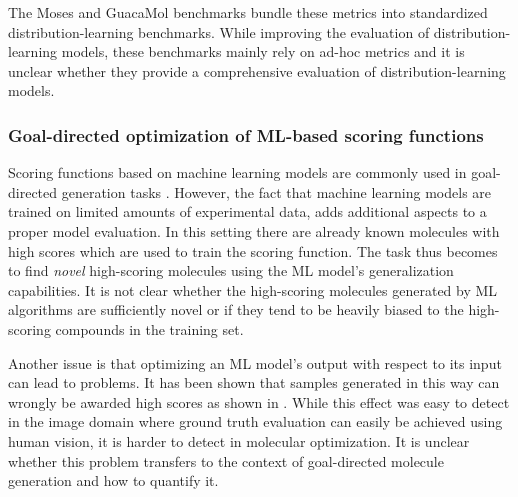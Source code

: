The Moses \citep{polykovskiyMolecularSetsMOSES2020} and GuacaMol
\citep{brownGuacaMolBenchmarkingModels2019} benchmarks bundle these metrics into standardized
distribution-learning benchmarks. While improving the evaluation of distribution-learning
models, these benchmarks mainly rely on ad-hoc metrics and it is unclear
whether they provide a comprehensive evaluation of distribution-learning models.

\subsubsection{Goal-directed optimization of ML-based scoring functions}
Scoring functions based on machine learning models are commonly used in goal-directed generation
tasks \citep{todo}. However, the fact that machine learning models are trained on limited amounts of
experimental data, adds additional aspects to a proper model evaluation. In this setting there are
already known molecules with high scores which are  used to train the scoring function. The task
thus becomes to find \emph{novel} high-scoring molecules using the ML model's generalization
capabilities. It is not clear whether the high-scoring molecules generated by ML algorithms are
sufficiently novel or if they tend to be heavily biased to the high-scoring compounds in the
training set.

Another issue is that optimizing an ML model's output with respect to its input can lead to
problems. It has been shown that samples generated in this way can wrongly be awarded high scores as
shown in
\citep{szegedyIntriguingPropertiesNeural2014,goodfellowExplainingHarnessingAdversarial2015}. While
this effect was easy to detect in the image domain where ground truth evaluation can easily be
achieved using human vision, it is harder to detect in molecular optimization. It is unclear whether
this problem transfers to the context of goal-directed molecule generation and how to quantify it.


